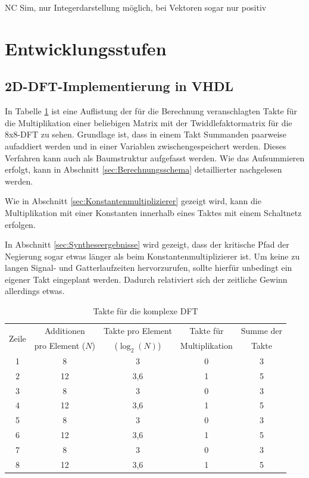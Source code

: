  
 NC Sim, nur Integerdarstellung möglich, bei Vektoren sogar nur positiv


\section{Entwicklungsstufen}

\subsection{2D-DFT-Implementierung in VHDL}

In Tabelle \ref{tab:TakteKomplexeDFT} ist eine Auflistung der für die Berechnung veranschlagten Takte für die Multiplikation einer beliebigen Matrix mit der
Twiddlefaktormatrix für die 8x8-DFT zu sehen. Grundlage ist, dass in einem Takt Summanden 
paarweise aufaddiert werden und in einer Variablen zwischengespeichert werden. Dieses Verfahren kann auch als Baumstruktur aufgefasst werden. 
Wie das Aufsummieren erfolgt, kann in Abschnitt \ref{sec:Berechnungsschema} detaillierter nachgelesen werden.

Wie in Abschnitt \ref{sec:Konstantenmultiplizierer} gezeigt wird, kann die Multiplikation mit einer Konstanten innerhalb eines Taktes mit einem Schaltnetz erfolgen. 

In Abschnitt \ref{sec:Syntheseergebnisse} wird gezeigt, dass der kritische Pfad der Negierung sogar etwas länger als beim Konstantenmultiplizierer ist.
Um keine zu langen Signal- und Gatterlaufzeiten hervorzurufen, sollte hierfür unbedingt ein eigener Takt eingeplant werden. Dadurch relativiert sich der zeitliche Gewinn allerdings 
etwas. 


\begin{table}[htbp]
\centering
\caption{Takte für die komplexe DFT}
\label{tab:TakteKomplexeDFT}
\begin{tabular}{ccccc}
\hline
\multirow{2}{*}{Zeile} & Additionen & Takte pro Element & Takte für & Summe der\\
      & pro Element ($N$) & ($\log_2(N)$) & Multiplikation & Takte\\
\hline
 1& 8  & 3   &0 &3\\
 2& 12 & 3,6 &1 &5\\
 3& 8  & 3   &0 &3\\
 4& 12 & 3,6 &1 &5\\
 5& 8  & 3   &0 &3\\
 6& 12 & 3,6 &1 &5\\
 7& 8  & 3   &0 &3\\
 8& 12 & 3,6 &1 &5\\
\hline
\end{tabular}
\end{table}

